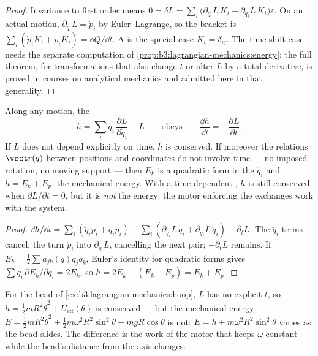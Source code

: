 \begin{proof}
Invariance to first order means
$0 = \delta L = \sum_i\big(\partial_{q_i}L\,K_i +
\partial_{\dot q_i}L\,\dot K_i\big)\varepsilon$. On an actual motion,
$\partial_{q_i}L = \dot p_i$ by Euler--Lagrange, so the bracket is
$\sum_i(\dot p_iK_i + p_i\dot K_i) = \dd Q/\dd t$. A 
is the special case $K_i = \delta_{ij}$. The time-shift case needs the
separate computation of
\cref{prop:b3:lagrangian-mechanics:energy}; the full theorem, for
transformations that also change $t$ or alter $L$ by a total
derivative, is proved in courses on analytical mechanics and admitted
here in that generality.
\end{proof}

\begin{proposition}\label{prop:b3:lagrangian-mechanics:energy}
Along any motion, the \emph{}
\[
h = \sum_i \dot q_i\,\frac{\partial L}{\partial\dot q_i} - L
\qquad\text{obeys}\qquad
\frac{\dd h}{\dd t} = -\frac{\partial L}{\partial t} .
\]
If $L$ does not depend explicitly on time, $h$ is conserved. If
moreover the relations $\vect r(q)$ between positions and coordinates
do not involve time --- no imposed rotation, no moving support --- then
$E_k$ is a quadratic form in the $\dot q_i$ and $h = E_k + E_p$: the
mechanical energy. With a time-dependent , $h$ is still
conserved when $\partial L/\partial t = 0$, but it is \emph{not} the
energy: the motor enforcing the  exchanges work with the
system.
\end{proposition}

\begin{proof}
$\dd h/\dd t = \sum_i(\ddot q_ip_i + \dot q_i\dot p_i) -
\sum_i(\partial_{q_i}L\,\dot q_i + \partial_{\dot q_i}L\,\ddot q_i) -
\partial_tL$. The $\ddot q_i$ terms cancel; the  turn $\dot p_i$ into $\partial_{q_i}L$, cancelling the next
pair; $-\partial_tL$ remains. If $E_k = \tfrac12\sum a_{jk}(q)\dot
q_j\dot q_k$, Euler's identity for quadratic forms gives $\sum\dot
q_i\,\partial E_k/\partial\dot q_i = 2E_k$, so $h = 2E_k - (E_k - E_p)
= E_k + E_p$.
\end{proof}

\begin{example}\label{ex:b3:lagrangian-mechanics:hoop-energy}
For the bead of \cref{ex:b3:lagrangian-mechanics:hoop}, $L$ has no
explicit $t$, so $h = \tfrac12 mR^2\dot\theta^2 + U_{\text{eff}}
(\theta)$ is conserved --- but the mechanical energy $E = \tfrac12
mR^2\dot\theta^2 + \tfrac12 m\omega^2R^2\sin^2\theta - mgR\cos\theta$
is not: $E = h + m\omega^2R^2\sin^2\theta$ varies as the bead slides.
The difference is the work of the motor that keeps $\omega$ constant
while the bead's distance from the axis changes.
\end{example}

